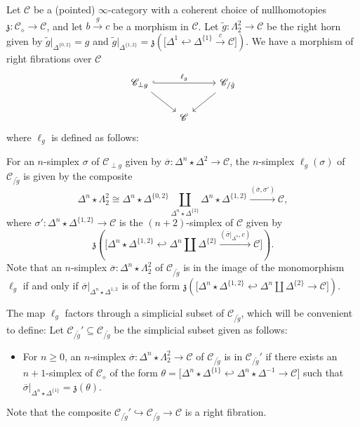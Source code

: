 \documentclass{tac}
\newcommand{\f}[1]{\mathfrak{#1}}
\newcommand{\s}[1]{\mathscr{#1}}
\newcommand{\ol}[1]{\overline{#1}}
\newcommand{\tx}[1]{\textnormal{#1}}
\begin{document}
\begin{rmk}[\tx{}\cite{thesis}, 1.5.9]\label{cohperpslicecomparison} Let $\s{C}$ be a (pointed) $\infty$-category with a coherent choice of nullhomotopies $\f{z} : \s{C}_\diamond \to \s{C}$, and let $b\xrightarrow{g} c$ be a morphism in $\s{C}$.  Let $\tilde{g} : \Lambda^2_2 \to \s{C}$ be the right horn given by $\tilde{g}|_{\Delta^{\{0,2\}}} = g$ and $\tilde{g}|_{\Delta^{\{1,2\}}} = \f{z} ( \big[ \Delta^1 \hookleftarrow \Delta^{\{1 \}} \xrightarrow{c} \s{C} \big] )$.  We have a morphism of right fibrations over $\s{C}$
\[\begin{tikzcd}
\s{C}_{\perp g} \arrow[]{dr} \arrow[hook]{rr}{\ell_g} & & \s{C}_{/\tilde{g}} \arrow[]{dl} \\ 
& \s{C} &
\end{tikzcd}\]
where $\ell_g$ is defined as follows:

For an $n$-simplex $\sigma$ of $\s{C}_{\perp g}$ given by $\ol{\sigma} : \Delta^n \star \Delta^2 \to \s{C}$, the $n$-simplex $\ell_g (\sigma )$ of $\s{C}_{/\tilde{g}}$ is given by the composite
\[ \Delta^n \star \Lambda^2_2 \cong \Delta^n \star \Delta^{\{ 0,2 \}} \coprod_{\Delta^n \star \Delta^{\{ 2 \}}} \Delta^n \star \Delta^{\{ 1,2 \}} \xrightarrow{( \ol{\sigma} , \sigma' )} \s{C}, \]
where $\sigma' : \Delta^n \star \Delta^{\{ 1,2 \}} \to \s{C}$ is the $(n+2)$-simplex of $\s{C}$ given by 
\[ \f{z}\left( \big[ \Delta^n \star \Delta^{\{ 1,2 \}} \hookleftarrow \Delta^n \coprod \Delta^{\{ 2 \}} \xrightarrow{( \ol{\sigma}|_{\Delta^n} , c )} \s{C} \big]  \right). \]
Note that an $n$-simplex $\ol{\sigma} : \Delta^n \star \Lambda^2_2$ of $\s{C}_{/\tilde{g}}$ is in the image of the monomorphism $\ell_g$ if and only if $\ol{\sigma}|_{\Delta^n \star \Delta^{1,2}}$ is of the form $\f{z}\left( \big[ \Delta^n \star \Delta^{\{ 1,2 \}} \hookleftarrow \Delta^n \coprod \Delta^{\{ 2 \}} \to \s{C} \big]  \right)$.

The map $\ell_g$ factors through a simplicial subset of $\s{C}_{/\tilde{g}}$, which will be convenient to define:  Let $\s{C}_{/\tilde{g}}' \subseteq \s{C}_{/\tilde{g}}$ be the simplicial subset given as follows:
\begin{itemize}
\item For $n\geq 0$, an $n$-simplex $\ol{\sigma} : \Delta^n \star \Lambda^2_2 \to \s{C}$ of $\s{C}_{/\tilde{g}}$ is in $\s{C}_{/\tilde{g}}' $ if there exists an $n+1$-simplex of $\s{C}_\diamond$ of the form 
$\theta = \big[  \Delta^n \star \Delta^{\{1 \}} \hookleftarrow  \Delta^n \star \Delta^{-1}  \to \s{C}  \big]$
such that $\ol{\sigma} |_{\Delta^n \star \Delta^{\{1 \}} } = \f{z}(\theta )$.
\end{itemize}
Note that the composite $ \s{C}_{/\tilde{g}}' \hookrightarrow \s{C}_{/\tilde{g}} \to \s{C}$ is a right fibration.
\end{rmk}
\end{document}

